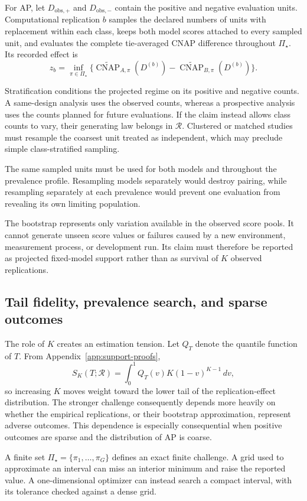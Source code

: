 \documentclass[11pt]{article}
\newcommand{\CNAP}{\operatorname{CNAP}}
\newcommand{\Regime}{\mathcal{R}}
\newcommand{\PSet}{\Pi_\star}
\newcommand{\CNAPta}{\widetilde{\CNAP}}
\theoremstyle{remark}
\begin{document}
For AP, let $D_{\mathrm{obs},+}$ and $D_{\mathrm{obs},-}$ contain the positive and negative evaluation units. Computational replication $b$ samples the declared numbers of units with replacement within each class, keeps both model scores attached to every sampled unit, and evaluates the complete tie-averaged CNAP difference throughout $\PSet$. Its recorded effect is
\[
z_b
=
\inf_{\pi\in\PSet}
\{\CNAPta_{A,\pi}(D^{(b)})-\CNAPta_{B,\pi}(D^{(b)})\}.
\]

Stratification conditions the projected regime on its positive and negative counts. A same-design analysis uses the observed counts, whereas a prospective analysis uses the counts planned for future evaluations. If the claim instead allows class counts to vary, their generating law belongs in $\Regime$. Clustered or matched studies must resample the coarsest unit treated as independent, which may preclude simple class-stratified sampling.

The same sampled units must be used for both models and throughout the prevalence profile. Resampling models separately would destroy pairing, while resampling separately at each prevalence would prevent one evaluation from revealing its own limiting population.

The bootstrap represents only variation available in the observed score pools. It cannot generate unseen score values or failures caused by a new environment, measurement process, or development run. Its claim must therefore be reported as projected fixed-model support rather than as survival of $K$ observed replications.

\subsection{Tail fidelity, prevalence search, and sparse outcomes}

The role of $K$ creates an estimation tension. Let $Q_T$ denote the quantile function of $T$. From Appendix~\ref{app:support-proofs},
\[
S_K(T;\Regime)
=
\int_0^1Q_T(v)K(1-v)^{K-1}\,dv,
\]
so increasing $K$ moves weight toward the lower tail of the replication-effect distribution. The stronger challenge consequently depends more heavily on whether the empirical replications, or their bootstrap approximation, represent adverse outcomes. This dependence is especially consequential when positive outcomes are sparse and the distribution of AP is coarse.

A finite set $\PSet=\{\pi_1,\ldots,\pi_G\}$ defines an exact finite challenge. A grid used to approximate an interval can miss an interior minimum and raise the reported value. A one-dimensional optimizer can instead search a compact interval, with its tolerance checked against a dense grid.
\end{document}
